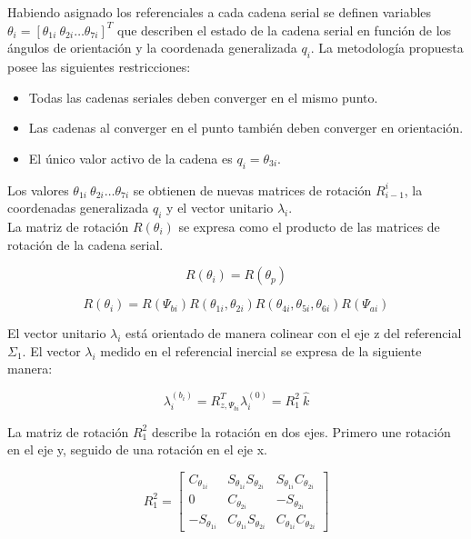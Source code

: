 Habiendo asignado los referenciales a cada cadena serial
se definen variables 
$  \theta_i = [\theta_{1i} \ \theta_{2i} \dots \theta_{7i}]^T$ que describen el estado
de la cadena serial en función de los ángulos de orientación
y la coordenada generalizada $q_i$.
La metodología propuesta posee las siguientes restricciones:
\begin{itemize}
  \item Todas las cadenas seriales deben converger en el mismo punto.
  \item Las cadenas al converger en el punto también 
  deben converger en orientación.
  \item El único valor activo de la cadena es $q_i = \theta_{3i}$.
\end{itemize}

Los valores $\theta_{1i} \ \theta_{2i} \dots \theta_{7i}$
se obtienen de nuevas matrices de rotación $R_{i-1}^i$,
la coordenadas generalizada $q_i$ y el vector unitario
$  \lambda_i$.\\

La matriz de rotación $R(  \theta_i)$ se expresa como el producto de las 
matrices de rotación de la cadena serial.

\begin{equation}
R(  \theta_i) = R(  \theta_p)
\end{equation}

\begin{equation} \label{eq: th_12-46}
R(  \theta_i) = R(\Psi_{bi})R(\theta_{1i},\theta_{2i})R(\theta_{4i},\theta_{5i},\theta_{6i})R(\Psi_{ai})
\end{equation}

El vector unitario $  \lambda_i$ está orientado
de manera colinear con el eje z del referencial $\Sigma_1$. 
El vector $  \lambda_i$ medido en el referencial inercial 
se expresa de la siguiente manera:

\begin{equation} \label{eq: th_12}
  \lambda_i^{(b_i)} = R^T_{z,\Psi_{bi}}   \lambda_i^{(0)} = R_{1}^{2} \  {\hat{k}}
\end{equation}

La matriz de rotación $R_1^2$ describe la rotación en dos ejes.
Primero une rotación en el eje y, seguido de una rotación en el eje x. 

\begin{equation}\label{eq: R_1_2}
R_1^2 = \begin{bmatrix}
C_{\theta_{1i}} & S_{\theta_{1i}} S_{\theta_{2i}} & S_{\theta_{1i}} C_{\theta_{2i}}\\
0 & C_{\theta_{2i}} & -S_{\theta_{2i}}\\
-S_{\theta_{1i}} & C_{\theta_{1i}} S_{\theta_{2i}} & C_{\theta_{1i}} C_{\theta_{2i}}
\end{bmatrix}
\end{equation}

